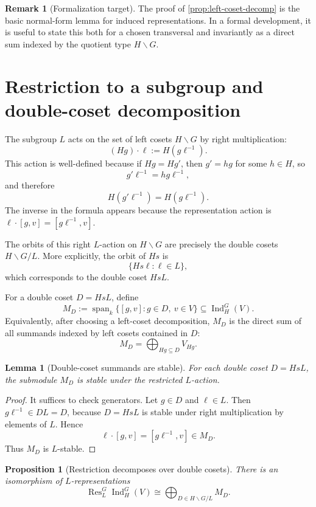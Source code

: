 \documentclass[11pt]{article}
\newtheorem{lemma}[theorem]{Lemma}
\newtheorem{proposition}[theorem]{Proposition}
\theoremstyle{definition}
\newtheorem{remark}[theorem]{Remark}
\newcommand{\Ind}{\operatorname{Ind}}
\newcommand{\Res}{\operatorname{Res}}
\newcommand{\Span}{\operatorname{span}}
\begin{document}
\begin{remark}[Formalization target]
The proof of \cref{prop:left-coset-decomp} is the basic normal-form lemma for induced representations. In a formal development, it is useful to state this both for a chosen transversal and invariantly as a direct sum indexed by the quotient type $H\backslash G$.
\end{remark}

\section{Restriction to a subgroup and double-coset decomposition}

The subgroup $L$ acts on the set of left cosets $H\backslash G$ by right multiplication:
\[
  (Hg)\cdot \ell := H(g\ell^{-1}).
\]
This action is well-defined because if $Hg=Hg'$, then $g'=hg$ for some $h\in H$, so
\[
  g'\ell^{-1}=hg\ell^{-1},
\]
and therefore
\[
  H(g'\ell^{-1})=H(g\ell^{-1}).
\]
The inverse in the formula appears because the representation action is $\ell\cdot[g,v]=[g\ell^{-1},v]$.

The orbits of this right $L$-action on $H\backslash G$ are precisely the double cosets $H\backslash G/L$. More explicitly, the orbit of $Hs$ is
\[
  \{Hs\ell : \ell\in L\},
\]
which corresponds to the double coset $HsL$.

For a double coset $D=HsL$, define
\[
  M_D := \Span_k\{[g,v] : g\in D,\ v\in V\}\subseteq \Ind_H^G(V).
\]
Equivalently, after choosing a left-coset decomposition, $M_D$ is the direct sum of all summands indexed by left cosets contained in $D$:
\[
  M_D = \bigoplus_{Hg\subseteq D} V_{Hg}.
\]

\begin{lemma}[Double-coset summands are stable]\label{lem:double-coset-stable}
For each double coset $D=HsL$, the submodule $M_D$ is stable under the restricted $L$-action.
\end{lemma}

\begin{proof}
It suffices to check generators. Let $g\in D$ and $\ell\in L$. Then $g\ell^{-1}\in DL=D$, because $D=HsL$ is stable under right multiplication by elements of $L$. Hence
\[
  \ell\cdot[g,v]=[g\ell^{-1},v]\in M_D.
\]
Thus $M_D$ is $L$-stable.
\end{proof}

\begin{proposition}[Restriction decomposes over double cosets]\label{prop:double-coset-decomp}
There is an isomorphism of $L$-representations
\[
  \Res^G_L\Ind_H^G(V)
  \cong
  \bigoplus_{D\in H\backslash G/L} M_D.
\]
\end{proposition}
\end{document}
